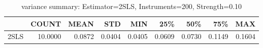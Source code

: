 \begin{table}[ht]
\centering
\caption{variance summary: Estimator=2SLS, Instruments=200, Strength=0.10}
\begin{tabular}{lrrrrrrrr}
\toprule
 & COUNT & MEAN & STD & MIN & 25\% & 50\% & 75\% & MAX \\
\midrule
2SLS & 10.0000 & 0.0872 & 0.0404 & 0.0405 & 0.0609 & 0.0730 & 0.1149 & 0.1604 \\
\bottomrule
\end{tabular}
\end{table}
